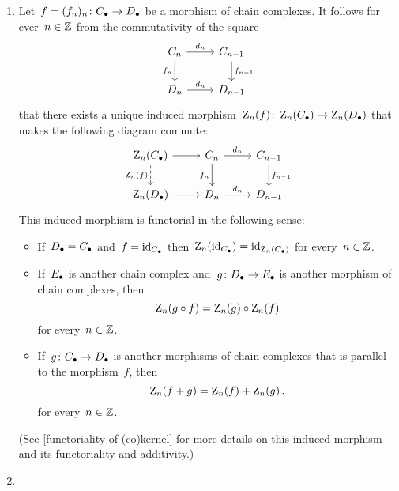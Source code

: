 \begin{remark}
  \label{functoriality of homology}
  \leavevmode
  \begin{enumerate}
    \item
      Let~$f = (f_n)_n \colon C_\bullet \to D_\bullet$ be a morphism of chain complexes.
      It follows for ever~$n \in \mathbb{Z}$ from the commutativity of the square
      \[
        \begin{tikzcd}
            C_n
            \arrow{r}[above]{d_n}
            \arrow{d}[left]{f_n}
          & C_{n-1}
            \arrow{d}[right]{f_{n-1}}
          \\
            D_n
            \arrow{r}[above]{d_n}
          & D_{n-1}
        \end{tikzcd}
      \]
      that there exists a unique induced morphism~$\operatorname{Z}_n(f) \colon \operatorname{Z}_n(C_\bullet) \to \operatorname{Z}_n(D_\bullet)$ that makes the following diagram commute:
      \[
        \begin{tikzcd}
            \Zl_n(\Ccc)
            \arrow{r}
            \arrow[dashed]{d}[left]{\Zl_n(f)}
          & C_n
            \arrow{r}[above]{d_n}
            \arrow{d}[left]{f_n}
          & C_{n-1}
            \arrow{d}[right]{f_{n-1}}
          \\
            \Zl_n(\Dcc)
            \arrow{r}
          & D_n
            \arrow{r}[above]{d_n}
          & D_{n-1}
        \end{tikzcd}
      \]
      This induced morphism is functorial in the following sense:
      \begin{itemize}
        \item
          If~$D_\bullet = C_\bullet$ and~$f = \operatorname{id}_{C_\bullet}$ then~$\operatorname{Z}_n(\operatorname{id}_{C_\bullet}) = \operatorname{id}_{\operatorname{Z}_n(C_\bullet)}$ for every~$n \in \mathbb{Z}$.
        \item
          If~$E_\bullet$ is another chain complex and~$g \colon D_\bullet \to E_\bullet$ is another morphism of chain complexes, then
          \[
              \operatorname{Z}_n(g \circ f)
            = \operatorname{Z}_n(g) \circ \operatorname{Z}_n(f)
          \]
          for every~$n \in \mathbb{Z}$.
        \item
          If~$g \colon C_\bullet \to D_\bullet$ is another morphisms of chain complexes that is parallel to the morphism~$f$, then
          \[
              \operatorname{Z}_n(f + g)
            = \operatorname{Z}_n(f) + \operatorname{Z}_n(g) \,.
          \]
          for every~$n \in \mathbb{Z}$.
      \end{itemize}
      (See \cref{functoriality of (co)kernel} for more details on this induced morphism and its functoriality and additivity.)
    \item

\end{enumerate}
\end{remark}
